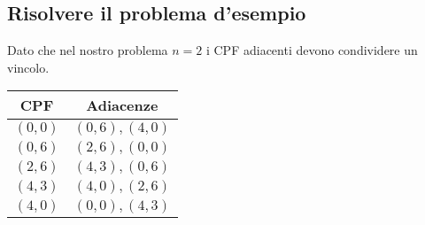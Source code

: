 \documentclass{article}
\begin{document}
\subsection{Risolvere il problema d'esempio}
\begin{minipage}{0.55\textwidth}
  Dato che nel nostro problema $n=2$ i CPF adiacenti devono condividere un vincolo.
\end{minipage}
\hfill
\begin{minipage}{0.30\textwidth}
  \begin{tabular}{|c|c|}
    \hline
    \textbf{CPF} & \textbf{Adiacenze} \\
    \hline
    $(0,0)$      & $(0,6),(4,0)$      \\
    $(0,6)$      & $(2,6),(0,0)$      \\
    $(2,6)$      & $(4,3),(0,6)$      \\
    $(4,3)$      & $(4,0),(2,6)$      \\
    $(4,0)$      & $(0,0),(4,3)$      \\
    \hline
  \end{tabular}
\end{minipage}
\end{document}
